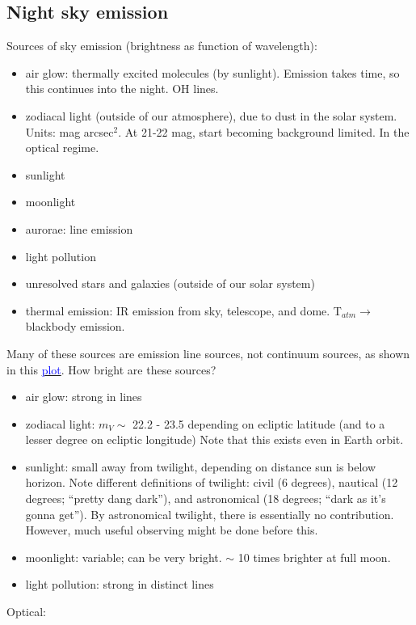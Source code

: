 \documentclass[12pt]{article}
\begin{document}
\subsection*{Night sky emission}
Sources of sky emission (brightness as function of wavelength):
\begin{itemize}
    \item air glow: thermally excited molecules (by sunlight).
    Emission takes time, so this continues into the night.
    OH lines.
    \item zodiacal light (outside of our atmosphere), due to dust in
    the solar system. Units: mag arcsec$^2$. At 21-22 mag, start
    becoming background limited. In the optical regime.
    \item sunlight
    \item moonlight
    \item aurorae: line emission
    \item light pollution
    \item unresolved stars and galaxies
        (outside of our solar system)
    \item thermal emission: IR emission from sky, telescope, and dome.
    T$_{atm} \rightarrow$ blackbody emission.
\end{itemize}
Many of these sources are emission line sources, not continuum
sources, as shown in this
\href{http://astronomy.nmsu.edu/holtz/a535/html/diagrams/a535/skyemiss.htm}
{\textcolor{blue}{plot}}.
How bright are these sources?
\begin{itemize}
    \item air glow: strong in lines
    \item zodiacal light: $m_V \sim$ 22.2 - 23.5 depending on ecliptic
    latitude (and to a lesser degree on ecliptic longitude)
    Note that this exists even in Earth orbit.
    \item sunlight: small away from twilight, depending on distance sun
    is below horizon. Note different definitions of twilight: civil (6
    degrees), nautical (12 degrees; ``pretty dang dark''),
    and astronomical (18 degrees; ``dark as it's gonna get'').
    By astronomical twilight, there is essentially no contribution.
    However, much useful observing might be done before this.
    \item moonlight: variable; can be very bright. $\sim$ 10 times
    brighter at full moon.
    \item light pollution: strong in distinct lines
\end{itemize}
Optical:
\end{document}
